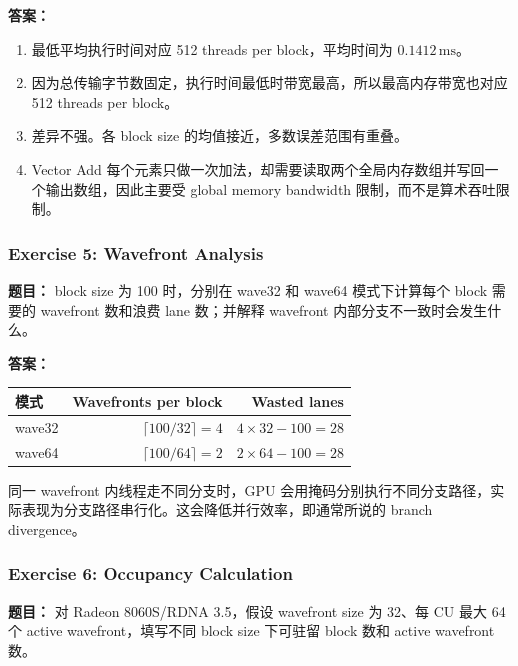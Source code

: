 \documentclass[10pt,a4paper]{article}
\begin{document}
\noindent\textbf{答案：}
\begin{enumerate}[label=\arabic*.]
\item 最低平均执行时间对应 512 threads per block，平均时间为 $0.1412\,\mathrm{ms}$。
\item 因为总传输字节数固定，执行时间最低时带宽最高，所以最高内存带宽也对应 512 threads per block。
\item 差异不强。各 block size 的均值接近，多数误差范围有重叠。
\item Vector Add 每个元素只做一次加法，却需要读取两个全局内存数组并写回一个输出数组，因此主要受 global memory bandwidth 限制，而不是算术吞吐限制。
\end{enumerate}

\subsubsection{Exercise 5: Wavefront Analysis}
\noindent\textbf{题目：} block size 为 100 时，分别在 wave32 和 wave64 模式下计算每个 block 需要的 wavefront 数和浪费 lane 数；并解释 wavefront 内部分支不一致时会发生什么。

\noindent\textbf{答案：}
\begin{center}
\small
\begin{tabular}{lrr}
\toprule
模式 & Wavefronts per block & Wasted lanes \\
\midrule
wave32 & $\lceil100/32\rceil=4$ & $4\times32-100=28$ \\
wave64 & $\lceil100/64\rceil=2$ & $2\times64-100=28$ \\
\bottomrule
\end{tabular}
\end{center}
同一 wavefront 内线程走不同分支时，GPU 会用掩码分别执行不同分支路径，实际表现为分支路径串行化。这会降低并行效率，即通常所说的 branch divergence。

\subsubsection{Exercise 6: Occupancy Calculation}
\noindent\textbf{题目：} 对 Radeon 8060S/RDNA 3.5，假设 wavefront size 为 32、每 CU 最大 64 个 active wavefront，填写不同 block size 下可驻留 block 数和 active wavefront 数。
\end{document}
